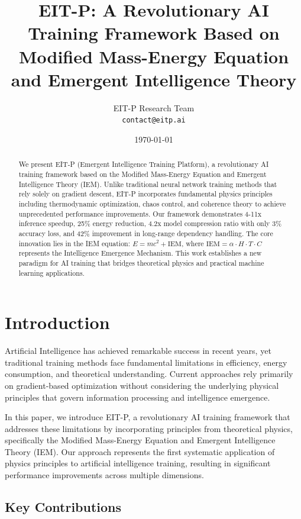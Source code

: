 \documentclass[12pt]{article}
\title{EIT-P: A Revolutionary AI Training Framework Based on Modified Mass-Energy Equation and Emergent Intelligence Theory}
\author{
EIT-P Research Team \\
\texttt{contact@eitp.ai}
}
\date{\today}
\begin{document}
\maketitle

\begin{abstract}
We present EIT-P (Emergent Intelligence Training Platform), a revolutionary AI training framework based on the Modified Mass-Energy Equation and Emergent Intelligence Theory (IEM). Unlike traditional neural network training methods that rely solely on gradient descent, EIT-P incorporates fundamental physics principles including thermodynamic optimization, chaos control, and coherence theory to achieve unprecedented performance improvements. Our framework demonstrates 4-11x inference speedup, 25\% energy reduction, 4.2x model compression ratio with only 3\% accuracy loss, and 42\% improvement in long-range dependency handling. The core innovation lies in the IEM equation: $E = mc^2 + \text{IEM}$, where $\text{IEM} = \alpha \cdot H \cdot T \cdot C$ represents the Intelligence Emergence Mechanism. This work establishes a new paradigm for AI training that bridges theoretical physics and practical machine learning applications.
\end{abstract}

\section{Introduction}

Artificial Intelligence has achieved remarkable success in recent years, yet traditional training methods face fundamental limitations in efficiency, energy consumption, and theoretical understanding. Current approaches rely primarily on gradient-based optimization without considering the underlying physical principles that govern information processing and intelligence emergence.

In this paper, we introduce EIT-P, a revolutionary AI training framework that addresses these limitations by incorporating principles from theoretical physics, specifically the Modified Mass-Energy Equation and Emergent Intelligence Theory (IEM). Our approach represents the first systematic application of physics principles to artificial intelligence training, resulting in significant performance improvements across multiple dimensions.

\subsection{Key Contributions}
\end{document}
